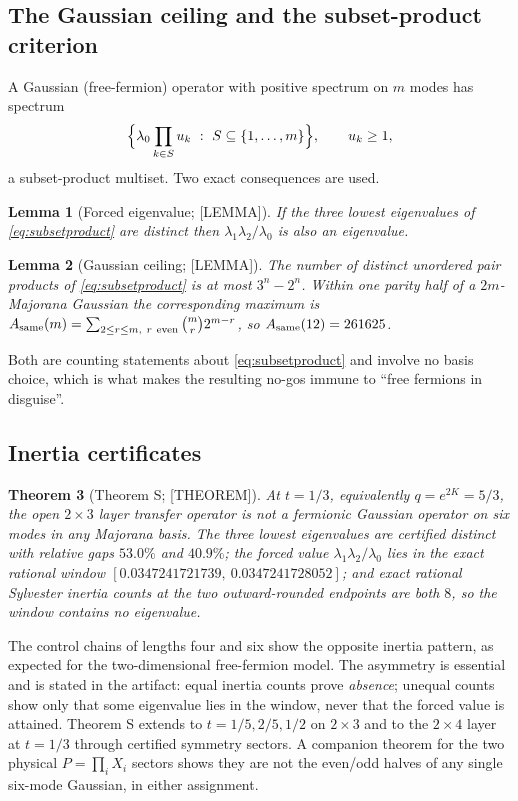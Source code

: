 \documentclass[11pt]{article}
\newtheorem{theorem}{Theorem}[section]
\newtheorem{lemma}[theorem]{Lemma}
\theoremstyle{definition}
\begin{document}
\subsection{The Gaussian ceiling and the subset-product criterion}
A Gaussian (free-fermion) operator with positive spectrum on $m$ modes has spectrum
\begin{equation}
\Bigl\{\lambda_0\prod_{k\in S}u_k\ :\ S\subseteq\{1,\dots,m\}\Bigr\},\qquad u_k\ge1,
\label{eq:subsetproduct}
\end{equation}
a subset-product multiset. Two exact consequences are used.

\begin{lemma}[Forced eigenvalue; {[LEMMA]}]\label{lem:forced}
If the three lowest eigenvalues of \eqref{eq:subsetproduct} are distinct then
$\lambda_1\lambda_2/\lambda_0$ is also an eigenvalue.
\end{lemma}

\begin{lemma}[Gaussian ceiling; {[LEMMA]}]\label{lem:ceiling}
The number of distinct unordered pair products of \eqref{eq:subsetproduct} is at most $3^n-2^n$.
Within one parity half of a $2m$-Majorana Gaussian the corresponding maximum is
$A_{\rm same}(m)=\sum_{2\le r\le m,\ r\ \mathrm{even}}\binom{m}{r}2^{m-r}$, so
$A_{\rm same}(12)=261625$.
\end{lemma}

Both are counting statements about \eqref{eq:subsetproduct} and involve no basis choice, which is
what makes the resulting no-gos immune to ``free fermions in disguise''.

\subsection{Inertia certificates}
\begin{theorem}[Theorem S; {[THEOREM]}]\label{thm:S}
At $t=1/3$, equivalently $q=e^{2K}=5/3$, the open $2\times3$ layer transfer operator is not a
fermionic Gaussian operator on six modes in any Majorana basis. The three lowest eigenvalues are
certified distinct with relative gaps $53.0\%$ and $40.9\%$; the forced value
$\lambda_1\lambda_2/\lambda_0$ lies in the exact rational window
$[0.0347241721739,\ 0.0347241728052]$; and exact rational Sylvester inertia counts at the two
outward-rounded endpoints are both $8$, so the window contains no eigenvalue.
\end{theorem}

The control chains of lengths four and six show the opposite inertia pattern, as expected for the
two-dimensional free-fermion model. The asymmetry is essential and is stated in the artifact: equal
inertia counts prove \emph{absence}; unequal counts show only that some eigenvalue lies in the
window, never that the forced value is attained. Theorem S extends to $t=1/5,2/5,1/2$ on $2\times3$
and to the $2\times4$ layer at $t=1/3$ through certified symmetry sectors. A companion theorem for
the two physical $P=\prod_iX_i$ sectors shows they are not the even/odd halves of any single six-mode
Gaussian, in either assignment.
\end{document}
